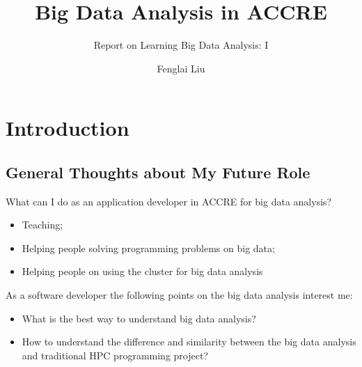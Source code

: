\documentclass[notheorems, aspectratio=54]{beamer}
\title[Big Data Analysis In ACCRE]{Big Data Analysis in ACCRE}
\subtitle{Report on Learning Big Data Analysis: I}
\author{Fenglai Liu}
\institute[ACCRE]{fenglai@accre.vanderbilt.edu}
\begin{document}
\begin{frame}
    \titlepage
\end{frame}

\section{Introduction}
\subsection{General Thoughts about My Future Role}
\begin{frame}

\begin{block}{What can I do as an application developer in ACCRE for big data analysis?}
\begin{itemize}
 \item Teaching;
 \item Helping people solving programming problems on big data;
 \item Helping people on using the cluster for big data analysis
\end{itemize}
\end{block}

 As a software developer the following points on the big data analysis interest me:
\begin{itemize}
 \item What is the best way to understand big data analysis? 
 \item How to understand the difference and similarity between the big data analysis and 
 traditional HPC programming project?
\end{itemize}

\end{frame}

\end{document}
